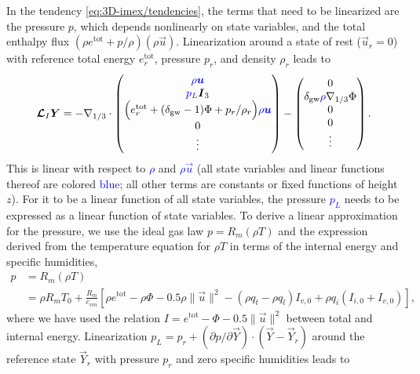 \documentclass{report}
\begin{document}
In the tendency \eqref{eq:3D-imex/tendencies}, the terms that need to be linearized are the pressure $p$, which depends nonlinearly on state variables, and the total enthalpy flux $(\rho e^{\mathrm{tot}} + p/\rho) (\rho \vec{u})$. Linearization around a state of rest ($\vec{u}_r=0$) with reference total energy $e^{\mathrm{tot}}_r$, pressure $p_r$, and density $\rho_r$ leads to
 \begin{equation}\label{e:IMEX_linear}
 \vec{\mathcal{L}}_I \vec{Y} = 
 -\nabla_{1/3} \cdot \begin{pmatrix}
 \textcolor{blue}{\rho \vec{u}} \\
 \textcolor{blue}{p_L} \vec{I}_3  \\
 \Bigl(e^{\mathrm{tot}}_r  + (\delta_{\mathrm{gw}}-1)\Phi + p_r/\rho_r \Bigr) \textcolor{blue}{\rho \vec{u}}\\
 0\\
\vdots
\end{pmatrix}
-
\begin{pmatrix}
0 \\
\delta_{\mathrm{gw}} \textcolor{blue} \rho \nabla_{1/3} \Phi \\
0\\
0\\
\vdots
\end{pmatrix}.
\end{equation}
This is linear with respect to \textcolor{blue}{$\rho$} and \textcolor{blue}{$\rho \vec{u}$} (all state variables and linear functions thereof are colored \textcolor{blue}{blue}; all other terms are constants or fixed functions of height $z$). For it to be a linear function of all state variables, the pressure \textcolor{blue}{$p_L$} needs to be expressed as a linear function of state variables. To derive a linear approximation for the pressure, we use the ideal gas law $p = R_m (\rho T)$ and the expression derived from the temperature equation 
for $\rho T$ in terms of the internal energy and specific humidities,
\begin{equation}\label{e:pressure}
\begin{split}
p &= R_m (\rho T) \\
  &= \rho R_m T_0 + \frac{R_m}{c_{vm}} \left[\rho e^{\mathrm{tot}} - \rho \Phi - 0.5 \rho \|\vec{u}\|^2 - (\rho q_t - \rho q_l) I_{v,0} + \rho q_i (I_{i,0} + I_{v,0}) \right],
\end{split}
\end{equation}
where we have used the relation $I = e^{\mathrm{tot}} - \Phi - 0.5 \|\vec{u}\|^2$ between total and internal energy. Linearization $p_L = p_r + (\partial p/\partial\vec{Y})\cdot(\vec{Y}-\vec{Y}_r)$ around the reference state $\vec{Y}_r$ with pressure $p_r$ and zero specific humidities leads to 
\end{document}
